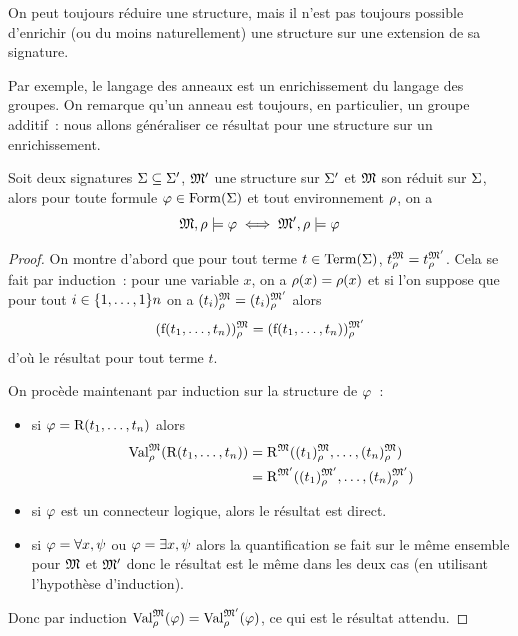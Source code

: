 \begin{remark}
  On peut toujours réduire une structure, mais il n'est pas toujours possible
  d'enrichir (ou du moins naturellement) une structure sur une extension de sa
  signature.
\end{remark}

Par exemple, le langage des anneaux est un enrichissement du langage des
groupes. On remarque qu'un anneau est toujours, en particulier, un groupe
additif~: nous allons généraliser ce résultat pour une structure sur un
enrichissement.

\begin{proposition}
  Soit deux signatures $\Sigma\subseteq\Sigma'$, $\mathfrak{M}'$ une structure
  sur $\Sigma'$ et $\mathfrak{M}$ son réduit sur $\Sigma$, alors pour
  toute formule $\varphi\in\operatorname{Form}(\Sigma)$ et tout environnement $\rho$, on a
  \[\mathfrak{M},\rho\models \varphi \iff \mathfrak{M}',\rho\models \varphi\]
\end{proposition}

\begin{proof}
  On montre d'abord que pour tout terme $t\in\operatorname{Term}(\Sigma)$,
  $t^{\mathfrak{M}}_{\rho} = t^{\mathfrak{M}'}_{\rho}$. Cela se fait par induction~: pour une
  variable $x$, on a $\rho(x) = \rho(x)$ et si l'on suppose que pour tout
  $i\in\{1,\ldots,1\}{n}$ on a $(t_i)^{\mathfrak{M}}_{\rho} = (t_i)^{\mathfrak{M}'}_{\rho}$
  alors
  \[(\mathrm{f}(t_1,\ldots,t_n))^{\mathfrak{M}}_{\rho} =
  (\mathrm{f}(t_1,\ldots,t_n))^{\mathfrak{M}'}_{\rho}\]
  d'où le résultat pour tout terme $t$.

  \noindent
  On procède maintenant par induction sur la structure de $\varphi$~:
  \begin{itemize}
  \item si $\varphi = \mathrm{R}(t_1,\ldots,t_n)$ alors
    \begin{align*}
      \operatorname{Val}_{\rho}^{\mathfrak{M}}(\mathrm{R}(t_1,\ldots,t_n)) &=
      \mathrm{R}^{\mathfrak{M}}((t_1)^{\mathfrak{M}}_{\rho},\ldots,(t_n)^{\mathfrak{M}}_{\rho}) \\
      &= \mathrm{R}^{\mathfrak{M}'}((t_1)^{\mathfrak{M}'}_{\rho},\ldots,
      (t_n)^{\mathfrak{M}'}_{\rho})
    \end{align*}
  \item si $\varphi$ est un connecteur logique, alors le résultat est direct.
  \item si $\varphi = \forall x, \psi$ ou $\varphi = \exists x, \psi$
    alors la quantification se
    fait sur le même ensemble pour $\mathfrak{M}$ et $\mathfrak{M}'$ donc le
    résultat est le même dans les deux cas (en utilisant l'hypothèse
    d'induction).
  \end{itemize}
  Donc par induction $\operatorname{Val}_{\rho}^{\mathfrak{M}}(\varphi) = \operatorname{Val}_{\rho}^{\mathfrak{M}'}(\varphi)$,
  ce qui est le résultat attendu.
\end{proof}

